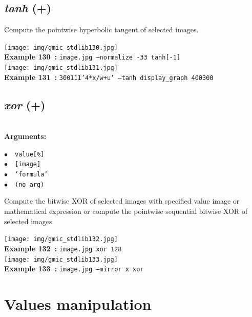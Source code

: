 \documentclass[a4paper,10.5pt,twoside]{book}
\def\comma{\discretionary{,}{}{,}}
\newcommand{\Cb}[1]{\textcolor{cb}{#1}}
\begin{document}
\subsection{\emph{tanh} (+)}\vspace*{-0.7em}
Compute the pointwise hyperbolic tangent of selected images.
\begin{center}\texttt{[image: img/gmic\_stdlib130.jpg]}\\
{\footnotesize \textbf{Example 130~:} \texttt{image.jpg --normalize -3{\comma}3 tanh[-1]}}
\\\texttt{[image: img/gmic\_stdlib131.jpg]}\\
{\footnotesize \textbf{Example 131~:} \texttt{300{\comma}1{\comma}1{\comma}1{\comma}'4*x/w+u' --tanh display\_graph 400{\comma}300}}
\end{center}

\subsection{\emph{xor} (+)}\vspace*{-0.7em}
~\\\textbf{\Cb{Arguments: }}\begin{flushleft}
{\small \Cb{\hspace*{0.5cm}$\bullet$~~\texttt{value[\%]}}}~~~\\
{\small \Cb{\hspace*{0.5cm}$\bullet$~~\texttt{[image]}}}~~~\\
{\small \Cb{\hspace*{0.5cm}$\bullet$~~\texttt{'formula'}}}~~~\\
{\small \Cb{\hspace*{0.5cm}$\bullet$~~\texttt{(no arg)}}}\end{flushleft}
Compute the bitwise XOR of selected images with specified value{\comma} image or mathematical
expression{\comma} or compute the pointwise sequential bitwise XOR of selected images.
\begin{center}\texttt{[image: img/gmic\_stdlib132.jpg]}\\
{\footnotesize \textbf{Example 132~:} \texttt{image.jpg xor 128}}
\\\texttt{[image: img/gmic\_stdlib133.jpg]}\\
{\footnotesize \textbf{Example 133~:} \texttt{image.jpg --mirror x xor}}
\end{center}
\section{Values manipulation}
\end{document}
